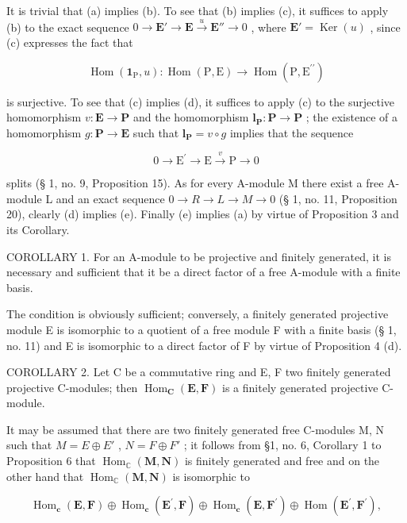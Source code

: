 It is trivial that (a) implies (b). To see that (b) implies (c), it suffices to apply (b) to the exact sequence \(0 \to \mathbf{E}' \to \mathbf{E} \xrightarrow{u} \mathbf{E}'' \to 0\) , where \(\mathbf{E}' = \operatorname{Ker}(u)\) , since (c) expresses the fact that

\[
\operatorname{Hom} \left(\mathbf {1} _ {\mathrm{P}}, u\right): \operatorname{Hom} (\mathrm{P}, \mathrm{E}) \rightarrow \operatorname{Hom} (\mathrm{P}, \mathrm{E} ^ {\prime \prime})
\]

is surjective. To see that (c) implies (d), it suffices to apply (c) to the surjective homomorphism \(v: \mathbf{E} \to \mathbf{P}\) and the homomorphism \(\mathbf{l}_{\mathbf{P}}: \mathbf{P} \to \mathbf{P}\) ; the existence of a homomorphism \(g: \mathbf{P} \to \mathbf{E}\) such that \(\mathbf{l}_{\mathbf{P}} = v \circ g\) implies that the sequence

\[
0 \longrightarrow \mathrm{E} ^ {\prime} \longrightarrow \mathrm{E} \stackrel {v} {\longrightarrow} \mathrm{P} \longrightarrow 0
\]

splits (§ 1, no. 9, Proposition 15). As for every A-module M there exist a free A-module L and an exact sequence \(0 \to R \to L \to M \to 0\) (§ 1, no. 11, Proposition 20), clearly (d) implies (e). Finally (e) implies (a) by virtue of Proposition 3 and its Corollary.

COROLLARY 1. For an A-module to be projective and finitely generated, it is necessary and sufficient that it be a direct factor of a free A-module with a finite basis.

The condition is obviously sufficient; conversely, a finitely generated projective module E is isomorphic to a quotient of a free module F with a finite basis (§ 1, no. 11) and E is isomorphic to a direct factor of F by virtue of Proposition 4 (d).

COROLLARY 2. Let C be a commutative ring and E, F two finitely generated projective C-modules; then \(\operatorname{Hom}_{\mathbf{C}}(\mathbf{E}, \mathbf{F})\) is a finitely generated projective C-module.

It may be assumed that there are two finitely generated free C-modules M, N such that \(M = E \oplus E'\) , \(N = F \oplus F'\) ; it follows from §1, no. 6, Corollary 1 to Proposition 6 that \(\operatorname{Hom}_{\mathbb{C}}(\mathbf{M}, \mathbf{N})\) is finitely generated and free and on the other hand that \(\operatorname{Hom}_{\mathbb{C}}(\mathbf{M}, \mathbf{N})\) is isomorphic to

\[
\operatorname{Hom} _ {\mathbf {c}} (\mathbf {E}, \mathbf {F}) \oplus \operatorname{Hom} _ {\mathbf {c}} (\mathbf {E} ^ {\prime}, \mathbf {F}) \oplus \operatorname{Hom} _ {\mathbf {c}} (\mathbf {E}, \mathbf {F} ^ {\prime}) \oplus \operatorname{Hom} (\mathbf {E} ^ {\prime}, \mathbf {F} ^ {\prime}),
\]

